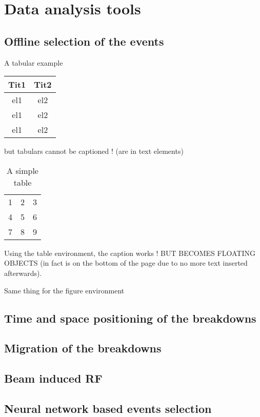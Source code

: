 \chapter[Data analysis tools]{Data analysis tools}

\section[Offline selection of the events]{Offline selection of the events}

A tabular example
\begin{center}

\begin{tabular}{cc}
\hline
\hline
Tit1	&	Tit2	\\
\hline
el1	&	el2	\\
el1	&	el2	\\
el1	&	el2	\\
\hline
\end{tabular}

\end{center}

but tabulars cannot be captioned ! (are in text elements)


\begin{table}
  \centering
    \begin{tabular}{| l c r |}
    \hline
    1 & 2 & 3 \\
    4 & 5 & 6 \\
    7 & 8 & 9 \\
    \hline
    \end{tabular}
  \caption{A simple table}
\end{table}

Using the table environment, the caption works ! BUT BECOMES FLOATING OBJECTS (in fact is on the bottom of the page due to no more text inserted afterwards).

Same thing for the figure environment

\section[Time and space positioning of the breakdowns]{Time and space positioning of the breakdowns}

\section[Migration of the breakdowns]{Migration of the breakdowns}

\section[Beam induced RF]{Beam induced RF}

\section[Neural network based events selection]{Neural network based events selection}